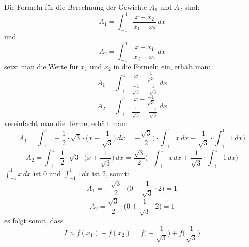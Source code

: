 Die Formeln für die Berechnung der Gewichte $A_{1}$ und $A_{2}$ sind:
\begin{equation*}
    A_{1} = \int_{-1}^{1} \frac{x - x_{2}}{x_{1} - x_{2}} \, dx
\end{equation*}
und
\begin{equation}
    A_{2} = \int_{-1}^{1} \frac{x - x_{1}}{x_{2} - x_{1}} \, dx
\end{equation}
setzt man die Werte für $x_{1}$ und $x_{2}$ in die Formeln ein, erhält man:
\begin{equation*}
    A_{1} = \int_{-1}^{1} \frac{x - \frac{1}{\sqrt{3}}}{\frac{-1}{\sqrt{3}} - \frac{1}{\sqrt{3}}} \, dx
\end{equation*}
\begin{equation}
    A_{2} = \int_{-1}^{1} \frac{x - \frac{-1}{\sqrt{3}}}{\frac{1}{\sqrt{3}} - \frac{-1}{\sqrt{3}}} \, dx
\end{equation}
vereinfacht man die Terme, erhält man:
\begin{equation*}
    A_{1} 
    =
    \int_{-1}^{1} -\frac{1}{2} 
    \cdot \sqrt{3} 
    \cdot \bigg(x - \frac{1}{\sqrt{3}}\bigg)
    \, dx
    =
    -\frac{\sqrt{3}}{2} 
    \bigg(
    \cdot \int_{-1}^{1}x\,dx
    -
    \frac{1}{\sqrt{3}} 
    \cdot \int_{-1}^{1}1\,dx
    \bigg)
\end{equation*}
\begin{equation}
    A_{2} 
    =
    \int_{-1}^{1} \frac{1}{2} 
    \cdot \sqrt{3}  
    \cdot \bigg(x + \frac{1}{\sqrt{3}}\bigg)
    \, dx
    =
    \frac{\sqrt{3}}{2} 
    \bigg(
    \cdot \int_{-1}^{1}x\,dx
    +
    \frac{1}{\sqrt{3}} 
    \cdot \int_{-1}^{1}1\,dx
    \bigg)
\end{equation}
$\int_{-1}^{1}x\,dx$ ist $0$ und $\int_{-1}^{1}1\,dx$ ist $2$, somit:
\begin{equation*}
    A_{1} 
    =
    -\frac{\sqrt{3}}{2} 
    \cdot 
    \bigg( 0
    -
    \frac{1}{\sqrt{3}} 
    \cdot 2
    \bigg)
    =
    1
\end{equation*}
\begin{equation}
    A_{2} 
    =
    \frac{\sqrt{3}}{2} 
    \cdot
    \bigg( 0
    +
    \frac{1}{\sqrt{3}} 
    \cdot 2
    \bigg)
    = 
    1
\end{equation}
es folgt somit, dass
\begin{equation}
    I 
    \approx 
    f(x_{1})+f(x_{2}) 
    = 
    f\biggl(-\frac{1}{\sqrt{3}}\biggr)
    +
    f\biggl(\frac{1}{\sqrt{3}}\biggr)
\end{equation}


